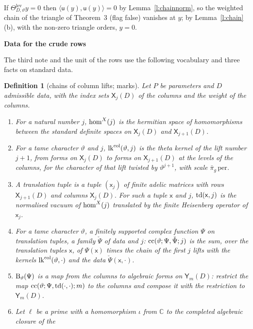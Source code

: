\documentclass[11pt,a4paper]{article}
\makeatletter
\newcommand{\kw}[1]{\emph{#1}}
\newcommand{\sect}[2]{\refstepcounter{section}\label{#2}\par\addvspace{19pt plus 4pt minus 2pt}\Needspace{7\baselineskip}%
  \noindent\llap{{\fontsize{13.2}{16}\selectfont\bfseries\color{inkfaint}\thesection}\hspace{9pt}}%
  {\fontsize{13.2}{16}\selectfont\bfseries\color{ink}#1}\par\nopagebreak\vspace{-1pt}}
\theoremstyle{plainx}
\theoremstyle{uprightx}
\newtheorem{definition}[theorem]{Definition}
\renewenvironment{proof}[1][Proof]{\par\pushQED{\qed}\normalfont\topsep0pt\partopsep0pt
  \trivlist\item[\hskip\labelsep\itshape #1.]\ignorespaces}{\popQED\endtrivlist\@endpefalse}
\newcommand{\dL}{\check{\Psi}}         %
\newcommand{\dS}{\Psi}
\newcommand{\sY}{\mathsf{Y}}
\newcommand{\sx}{\mathsf{x}}
\newcommand{\CC}{\mathbb{C}}
\newcommand{\ip}[2]{\langle #1,#2\rangle}
\makeatother
\begin{document}
\begin{proof}[Proof of Theorem 4]
If $\Theta^{\mathrm{lev}}_{D,\vartheta}y=0$ then $\ip{\mathsf{u}(y)}{\mathsf{u}(y)}=0$ by Lemma~\ref{l:chainnorm}, so
the weighted chain of the triangle of Theorem~3 (flag false) vanishes at $y$; by Lemma~\ref{l:chain}\,(b), with
the non-zero triangle orders, $y=0$.
\end{proof}

\sect{Data for the crude rows}{s:crude}
The third note and the unit of the rows use the following vocabulary and three facts on standard data.

\begin{definition}[chains of column lifts; marks]\label{d:crude}
Let $P$ be parameters and $D$ admissible data, with the index sets $\mathsf{X}_{j}(D)$ of the columns and the weight
of the columns.
\begin{enumerate}[label=\textup{(\alph*)},leftmargin=2.3em,itemsep=1pt]
\item For a natural number $j$, $\operatorname{hom}^{X}(j)$ is the hermitian space of homomorphisms between the standard definite
spaces on $\mathsf{X}_{j}(D)$ and $\mathsf{X}_{j+1}(D)$.
\item For a tame character $\vartheta$ and $j$, $\operatorname{lk}^{\mathrm{col}}(\vartheta,j)$ is the theta kernel of the lift
number $j+1$, from forms on $\mathsf{X}_{j}(D)$ to forms on $\mathsf{X}_{j+1}(D)$ at the levels of the columns, for
the character of that lift twisted by $\vartheta^{j+1}$, with scale $\bar\pi_g\,\mathrm{per}$.
\item A \kw{translation tuple} is a tuple $(\sx_{j})$ of finite adelic matrices with rows $\mathsf{X}_{j+1}(D)$ and
columns $\mathsf{X}_{j}(D)$. For such a tuple $\sx$ and $j$, $\translateDatum{\sx}{j}$ is the normalised vacuum of
$\operatorname{hom}^{X}(j)$ translated by the finite Heisenberg operator of $\sx_{j}$.
\item For a tame character $\vartheta$, a finitely supported complex function $\dS$ on translation tuples, a
family $\dL$ of data and $j$: $\chainComb{\vartheta}{\dS}{\dL}{j}$ is the sum, over the translation tuples
$\sx$, of $\dS(\sx)$ times the chain of the first $j$ lifts with the kernels $\operatorname{lk}^{\mathrm{col}}(\vartheta,\cdot)$ and
the data $\dL(\sx,\cdot)$.
\item $\Bmu{\vartheta}{\dS}$ is a map from the columns to algebraic forms on $\sY_m(D)$: restrict the map
$\chainComb{\vartheta}{\dS}{\translateDatum{\cdot}{\cdot}}{m}$ to the columns and compose it with the restriction
to $\sY_m(D)$.
\item Let $\ell$ be a prime with a homomorphism $\iota$ from $\CC$ to the completed algebraic closure of the

\end{enumerate}
\end{definition}
\end{document}

